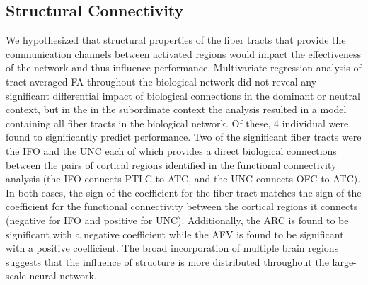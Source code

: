 \documentclass[final,authoryear,5p,times,twocolumn]{elsarticle}
\begin{document}
\subsection{Structural Connectivity}
We hypothesized that structural properties of the fiber tracts that provide the communication channels between activated regions would impact the effectiveness of the network and thus influence performance. Multivariate regression analysis of tract-averaged FA throughout the biological network did not reveal any significant differential impact of biological connections in the dominant or neutral context, but in the in the subordinate context the analysis resulted in a model containing all fiber tracts in the biological network. Of these, 4 individual were found to significantly predict performance. Two of the significant fiber tracts were the IFO and the UNC each of which provides a direct biological connections between the pairs of cortical regions identified in the functional connectivity analysis (the IFO connects PTLC to ATC, and the UNC connects OFC to ATC). In both cases, the sign of the coefficient for the fiber tract matches the sign of the coefficient for the functional connectivity between the cortical regions it connects (negative for IFO and positive for UNC). Additionally, the ARC is found to be significant with a negative coefficient while the AFV is found to be significant with a positive coefficient. The broad incorporation of multiple brain regions suggests that the influence of structure is more distributed throughout the large-scale neural network. 
\end{document}
